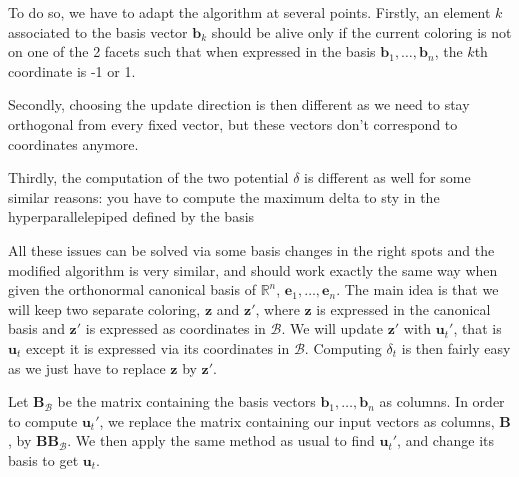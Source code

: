 \documentclass[12pt]{article}
\begin{document}
To do so, we have to adapt the algorithm at several points. Firstly, an element $k$ associated to the basis vector $\textbf{b}_k$ should be alive only if the current coloring is not on one of the 2 facets such that when expressed in the basis $\textbf{b}_1,\dots,\textbf{b}_n$, the $k$th coordinate is -1 or 1. 

Secondly, choosing the update direction is then different as we need to stay orthogonal from every fixed vector, but these vectors don't correspond to coordinates anymore.

Thirdly, the computation of the two potential $\delta$ is different as well for some similar reasons: you have to compute the maximum delta to sty in the hyperparallelepiped defined by the basis

All these issues can be solved via some basis changes in the right spots and the modified algorithm is very similar, and should work exactly the same way when given the orthonormal canonical basis of $\mathbb{R}^n$, $\textbf{e}_1,\dots,\textbf{e}_n$. The main idea is that we will keep two separate coloring, $\textbf{z}$ and $\textbf{z}'$, where $\textbf{z}$ is expressed in the canonical basis and $\textbf{z}'$ is expressed as coordinates in $\mathcal{B}$. We will update $\textbf{z}'$ with $\textbf{u}_t'$, that is $\textbf{u}_t$ except it is expressed via its coordinates in $\mathcal{B}$. Computing $\delta_t$ is then fairly easy as we just have to replace $\textbf{z}$ by $\textbf{z}'$. 

Let $\textbf{B}_{\mathcal{B}}$ be the matrix containing the basis vectors $\textbf{b}_1,\dots,\textbf{b}_n$ as columns. In order to compute $\textbf{u}_t'$, we replace the matrix containing our input vectors as columns, $\textbf{B}$, by $\textbf{B}\textbf{B}_{\mathcal{B}}$. We then apply the same method as usual to find $\textbf{u}_t'$, and change its basis to get $\textbf{u}_t$.
\end{document}
